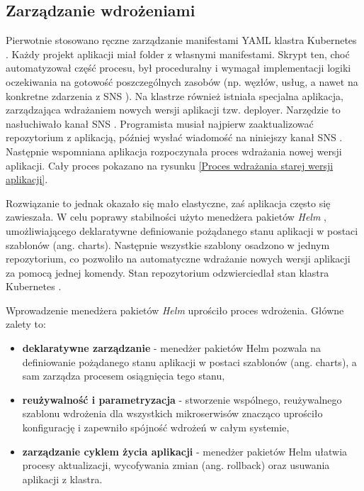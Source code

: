 \subsection{Zarządzanie wdrożeniami}

Pierwotnie stosowano ręczne zarządzanie manifestami YAML \cite{yaml_spec} klastra Kubernetes \cite{kubernetes}. Każdy projekt aplikacji miał folder z własnymi manifestami. Skrypt ten, choć automatyzował część procesu, był proceduralny i wymagał implementacji logiki oczekiwania na gotowość poszczególnych zasobów (np. węzłów, usług, a nawet na konkretne zdarzenia z SNS \cite{sns_docs}). Na klastrze również istniała specjalna aplikacja, zarządzająca wdrażaniem nowych wersji aplikacji tzw. deployer. Narzędzie to nasłuchiwało kanał SNS \cite{sns_docs}. Programista musiał najpierw zaaktualizować repozytorium z aplikacją, później wysłać wiadomość na niniejszy kanał SNS \cite{sns_docs}. Następnie wspomniana aplikacja rozpoczynała proces wdrażania nowej wersji aplikacji. Cały proces pokazano na rysunku \ref{Proces wdrażania starej wersji aplikacji}.


Rozwiązanie to jednak okazało się mało elastyczne, zaś aplikacja często się zawieszała. W celu poprawy stabilności użyto menedżera pakietów \textit{Helm} \cite{helm_docs}, umożliwiającego deklaratywne definiowanie pożądanego stanu aplikacji w postaci szablonów (ang. \mbox{charts}). Następnie wszystkie szablony osadzono w jednym repozytorium, co pozwoliło na automatyczne wdrażanie nowych wersji aplikacji za pomocą jednej komendy. Stan repozytorium odzwierciedlał stan klastra Kubernetes \cite{kubernetes}.

Wprowadzenie menedżera pakietów \textit{Helm} \cite{helm_docs} uprościło proces wdrożenia. Główne zalety to:

\vspace{0.3em}

\begin{itemize}
    \item \textbf{deklaratywne zarządzanie} - menedżer pakietów Helm \cite{helm_docs} pozwala na definiowanie pożądanego stanu aplikacji w postaci szablonów (ang. charts), a sam zarządza procesem osiągnięcia tego stanu,
    \item \textbf{reużywalność i parametryzacja} - stworzenie wspólnego, reużywalnego szablonu wdrożenia dla wszystkich mikroserwisów znacząco uprościło konfigurację i zapewniło spójność wdrożeń w całym systemie,
    \item \textbf{zarządzanie cyklem życia aplikacji} - menedżer pakietów Helm \cite{helm_docs} ułatwia procesy aktualizacji, wycofywania zmian (ang. rollback) oraz usuwania aplikacji z klastra.
\end{itemize}

